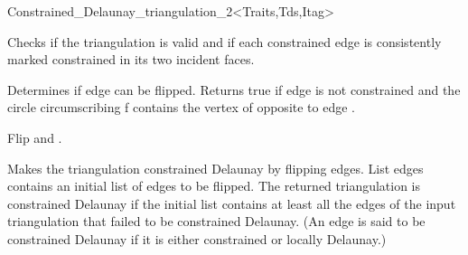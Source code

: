 \begin{ccRefClass}{Constrained_Delaunay_triangulation_2<Traits,Tds,Itag>}

{ Checks if the triangulation is valid and if each constrained edge is
 consistently marked constrained in its two incident faces.}

\begin{ccAdvanced}

{ Determines if edge  can be flipped. Returns true if
edge  is not constrained and  the circle circumscribing f
contains  the vertex of 
opposite to edge . }

{ Flip  and .}


{ Makes the triangulation constrained Delaunay by flipping edges. 
List edges contains an
initial list of edges to be flipped. The returned
triangulation is constrained Delaunay 
if the initial list contains at least all the edges of the
input triangulation that failed to be 
constrained Delaunay. (An edge is said to be 
constrained Delaunay if it is  either constrained or
locally Delaunay.) }
\end{ccAdvanced}


\ccSeeAlso
{} \\
 \\
 \\
 \\
 \\





\end{ccRefClass}



